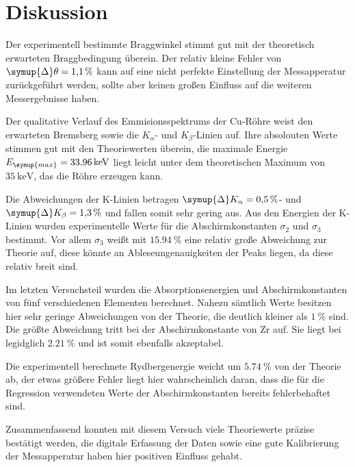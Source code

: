 \section{Diskussion}
\label{sec:Diskussion}
Der experimentell bestimmte Braggwinkel stimmt gut mit der theoretisch erwarteten Braggbedingung überein.
Der relativ kleine Fehler von $\symup{\Delta}\theta = \qty{1,1}{\percent}$ kann auf eine nicht
perfekte Einstellung der Messapperatur zurückgeführt werden, sollte aber keinen großen Einfluss auf die
weiteren Messergebnisse haben.

Der qualitative Verlauf des Emmisionsspektrums der Cu-Röhre weist den erwarteten Bremsberg
sowie die $K_{\alpha}$- und $K_{\beta}$-Linien auf. Ihre absolouten Werte stimmen gut
mit den Theoriewerten überein, die maximale Energie $E_{\symup{max}} = \qty{33.96}{\kilo\electronvolt}$
liegt leicht unter dem theoretischen Maximum von $\qty{35}{\kilo\electronvolt}$, das die Röhre
erzeugen kann.

Die Abweichungen der K-Linien betragen $\symup{\Delta}K_{\alpha}=\qty{0,5}{\percent}$- und
$\symup{\Delta}K_{\beta}=\qty{1,3}{\percent}$ und fallen somit sehr gering aus.
Aus den Energien der K-Linien wurden experimentelle Werte für die Abschirmkonstanten
$\sigma_2$ und $\sigma_3$ bestimmt. Vor allem $\sigma_3$ weißt mit $\qty{15,94}{\percent}$ eine
relativ große Abweichung zur Theorie auf, diese könnte an Ableseungenauigkeiten der Peaks liegen,
da diese relativ breit sind.

Im letzten Versuchsteil wurden die Absorptionsenergien und Abschirmkonstanten von fünf verschiedenen Elementen
berechnet. Nahezu sämtlich Werte besitzen hier sehr geringe Abweichungen von der Theorie, die deutlich kleiner als
$\qty{1}{\percent}$ sind. Die größte Abweichung tritt bei der Abschirmkonstante von Zr auf.
Sie liegt bei legidglich $\qty{2,21}{\percent}$ und ist somit ebenfalls akzeptabel.

Die experimentell berechnete Rydbergenergie weicht um  $\qty{5,74}{\percent}$ von der Theorie ab,
der etwas größere Fehler liegt hier wahrscheinlich daran, dass die für die Regression verwendeten Werte
der Abschirmkonstanten bereits fehlerbehaftet sind.

Zusammenfassend konnten mit diesem Versuch viele Theoriewerte präzise bestätigt werden, die digitale Erfassung
der Daten sowie eine gute Kalibrierung der Messapperatur haben hier positiven Einfluss gehabt.

